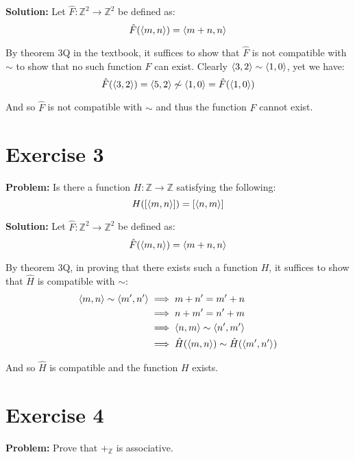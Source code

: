 \documentclass{article}
\begin{document}
\noindent\textbf{Solution:} Let $\hat{F}:\mathbb Z^2\to \mathbb Z^2$ be defined as:
\begin{equation*}
    \hat{F}(\langle m,n\rangle)=\langle m+n,n\rangle
\end{equation*}

By theorem 3Q in the textbook, it suffices to show that $\hat{F}$ is not compatible with $\sim$ to show that no such function $F$ can exist. Clearly $\langle3,2\rangle\sim\langle1,0\rangle$, yet we have:
\begin{equation*}
    \hat{F}(\pair{3}{2})=\pair{5}{2}\centernot\sim\pair{1}{0}=\hat{F}(\pair{1}{0})\\
\end{equation*}

And so $\hat{F}$ is not compatible with $\sim$ and thus the function $F$ cannot exist.

\section*{Exercise 3}
\noindent\textbf{Problem:} Is there a function $H:\mathbb Z\to \mathbb Z$ satisfying the following:
\begin{equation*}
    H([\langle m,n\rangle])=[\langle n,m\rangle]
\end{equation*}
\smallskip
\bigskip

\noindent\textbf{Solution:} Let $\hat{F}:\mathbb Z^2\to \mathbb Z^2$ be defined as:
\begin{equation*}
    \hat{F}(\langle m,n\rangle)=\langle m+n,n\rangle
\end{equation*}

By theorem 3Q, in proving that there exists such a function $H$, it suffices to show that $\hat{H}$ is compatible with $\sim$:
\begin{align*}
    \langle m,n\rangle\sim\langle m',n'\rangle&\implies m+n'=m'+n\\
    &\implies n+m'=n'+m\\
    &\implies \langle n,m\rangle\sim\langle n',m'\rangle\\
    &\implies \hat{H}(\langle m,n\rangle)\sim \hat{H}(\langle m',n'\rangle)
\end{align*}

And so $\hat{H}$ is compatible and the function $H$ exists.

\section*{Exercise 4}
\noindent\textbf{Problem:} Prove that $+_\mathbb Z$ is associative.
\bigskip
\end{document}
